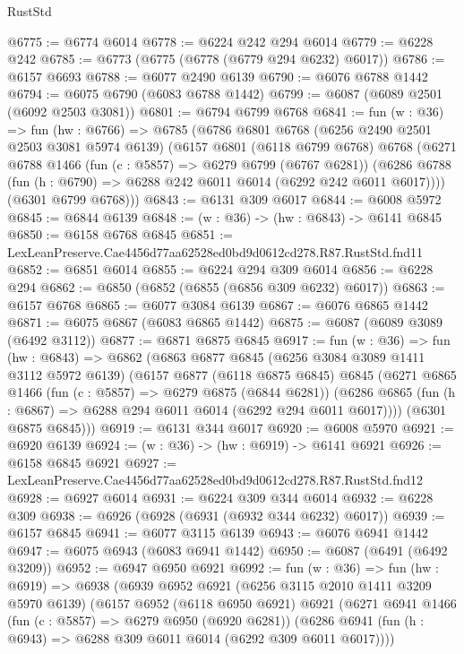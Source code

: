 \begin{lexlean}{RustStd}
\begin{coremodule}
{{@6775 := @6774 @6014
@6778 := @6224 @242 @294 @6014
@6779 := @6228 @242
@6785 := @6773 (@6775 (@6778 (@6779 @294 @6232) @6017))
@6786 := @6157 @6693
@6788 := @6077 @2490 @6139
@6790 := @6076 @6788 @1442
@6794 := @6075 @6790 (@6083 @6788 @1442)
@6799 := @6087 (@6089 @2501 (@6092 @2503 @3081))
@6801 := @6794 @6799 @6768
@6841 := fun (w : @36) =>
  fun (hw : @6766) =>
  @6785
    (@6786
      @6801
      @6768
      (@6256 @2490 @2501 @2503 @3081 @5974 @6139)
      (@6157
        @6801
        (@6118 @6799 @6768)
        @6768
        (@6271
          @6788
          @1466
          (fun (c : @5857) => @6279 @6799 (@6767 @6281))
          (@6286 @6788 (fun (h : @6790) => @6288 @242 @6011 @6014 (@6292 @242 @6011 @6017))))
        (@6301 @6799 @6768)))
@6843 := @6131 @309 @6017
@6844 := @6008 @5972
@6845 := @6844 @6139
@6848 := (w : @36) -> (hw : @6843) -> @6141 @6845
@6850 := @6158 @6768 @6845
@6851 := LexLeanPreserve.Cae4456d77aa62528ed0bd9d0612cd278.R87.RustStd.fnd11
@6852 := @6851 @6014
@6855 := @6224 @294 @309 @6014
@6856 := @6228 @294
@6862 := @6850 (@6852 (@6855 (@6856 @309 @6232) @6017))
@6863 := @6157 @6768
@6865 := @6077 @3084 @6139
@6867 := @6076 @6865 @1442
@6871 := @6075 @6867 (@6083 @6865 @1442)
@6875 := @6087 (@6089 @3089 (@6492 @3112))
@6877 := @6871 @6875 @6845
@6917 := fun (w : @36) =>
  fun (hw : @6843) =>
  @6862
    (@6863
      @6877
      @6845
      (@6256 @3084 @3089 @1411 @3112 @5972 @6139)
      (@6157
        @6877
        (@6118 @6875 @6845)
        @6845
        (@6271
          @6865
          @1466
          (fun (c : @5857) => @6279 @6875 (@6844 @6281))
          (@6286 @6865 (fun (h : @6867) => @6288 @294 @6011 @6014 (@6292 @294 @6011 @6017))))
        (@6301 @6875 @6845)))
@6919 := @6131 @344 @6017
@6920 := @6008 @5970
@6921 := @6920 @6139
@6924 := (w : @36) -> (hw : @6919) -> @6141 @6921
@6926 := @6158 @6845 @6921
@6927 := LexLeanPreserve.Cae4456d77aa62528ed0bd9d0612cd278.R87.RustStd.fnd12
@6928 := @6927 @6014
@6931 := @6224 @309 @344 @6014
@6932 := @6228 @309
@6938 := @6926 (@6928 (@6931 (@6932 @344 @6232) @6017))
@6939 := @6157 @6845
@6941 := @6077 @3115 @6139
@6943 := @6076 @6941 @1442
@6947 := @6075 @6943 (@6083 @6941 @1442)
@6950 := @6087 (@6491 (@6492 @3209))
@6952 := @6947 @6950 @6921
@6992 := fun (w : @36) =>
  fun (hw : @6919) =>
  @6938
    (@6939
      @6952
      @6921
      (@6256 @3115 @2010 @1411 @3209 @5970 @6139)
      (@6157
        @6952
        (@6118 @6950 @6921)
        @6921
        (@6271
          @6941
          @1466
          (fun (c : @5857) => @6279 @6950 (@6920 @6281))
          (@6286 @6941 (fun (h : @6943) => @6288 @309 @6011 @6014 (@6292 @309 @6011 @6017))))
}}
\end{coremodule}
\end{lexlean}
